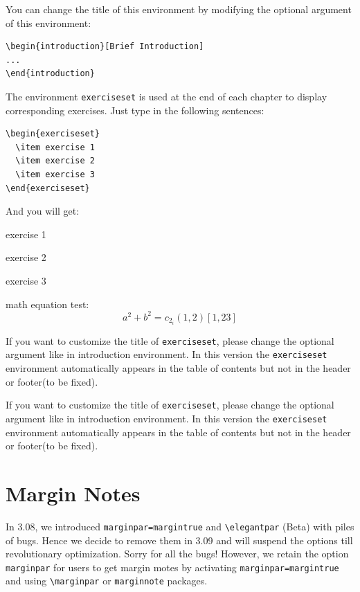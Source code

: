 \documentclass[11pt]{elegantbook}
\begin{document}
You can change the title of this environment by modifying the optional argument of this environment:
\begin{lstlisting}
\begin{introduction}[Brief Introduction]
...
\end{introduction}
\end{lstlisting}

The environment \lstinline{exerciseset} is used at the end of each chapter to display corresponding exercises. Just type in the following sentences:
\begin{lstlisting}
\begin{exerciseset}
  \item exercise 1
  \item exercise 2
  \item exercise 3
\end{exerciseset}
\end{lstlisting}
And you will get:
\begin{exerciseset}
  \item exercise 1
  \item exercise 2
  \item exercise 3
  \item math equation test:
  \begin{equation}
  a^2+b^2=c_{2_{i}} (1,2) [1,23]
  \end{equation}
\end{exerciseset}
\begin{remark}
If you want to customize the title of \lstinline{exerciseset}, please change the optional argument like in introduction environment. In this version the \lstinline{exerciseset} environment automatically appears in the table of contents but not in the header or footer(to be fixed).
\end{remark}
\begin{solution}
  If you want to customize the title of \lstinline{exerciseset}, please change the optional argument like in introduction environment. In this version the \lstinline{exerciseset} environment automatically appears in the table of contents but not in the header or footer(to be fixed).
\end{solution}

\section{Margin Notes}
In 3.08, we introduced \lstinline{marginpar=margintrue} and \lstinline{\elegantpar} (Beta) with piles of bugs. Hence we decide to remove them in 3.09 and will suspend the options till revolutionary optimization. Sorry for all the bugs! However, we retain the option \lstinline{marginpar} for users to get margin motes by activating \lstinline{marginpar=margintrue} and using \lstinline{\marginpar} or \lstinline{marginnote} packages.
\end{document}
